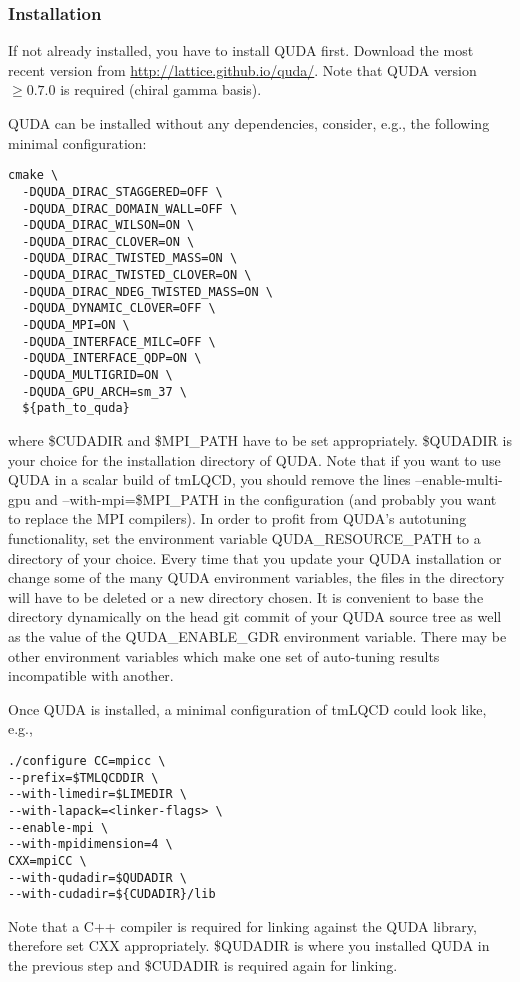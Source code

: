 \subsubsection{Installation}
If not already installed, you have to install QUDA first. Download the most recent version from \url{http://lattice.github.io/quda/}. Note that QUDA version $\geq 0.7.0$ is required (chiral gamma basis).

QUDA can be installed without any dependencies, consider, e.g., the following minimal configuration:

\begin{verbatim}
cmake \
  -DQUDA_DIRAC_STAGGERED=OFF \
  -DQUDA_DIRAC_DOMAIN_WALL=OFF \
  -DQUDA_DIRAC_WILSON=ON \
  -DQUDA_DIRAC_CLOVER=ON \
  -DQUDA_DIRAC_TWISTED_MASS=ON \
  -DQUDA_DIRAC_TWISTED_CLOVER=ON \
  -DQUDA_DIRAC_NDEG_TWISTED_MASS=ON \
  -DQUDA_DYNAMIC_CLOVER=OFF \
  -DQUDA_MPI=ON \
  -DQUDA_INTERFACE_MILC=OFF \
  -DQUDA_INTERFACE_QDP=ON \ 
  -DQUDA_MULTIGRID=ON \
  -DQUDA_GPU_ARCH=sm_37 \
  ${path_to_quda}
\end{verbatim}
where {\ttfamily \$CUDADIR} and {\ttfamily \$MPI\_PATH} have to be set appropriately.
{\ttfamily \$QUDADIR} is your choice for the installation directory of QUDA.
Note that if you want to use QUDA in a scalar build of tmLQCD, you should remove the lines {\ttfamily --enable-multi-gpu} and {\ttfamily --with-mpi=\$MPI\_PATH} in the configuration (and probably you want to replace the MPI compilers).
In order to profit from QUDA's autotuning functionality, set the environment variable {\ttfamily QUDA\_RESOURCE\_PATH} to a directory of your choice.
Every time that you update your QUDA installation or change some of the many QUDA environment variables, the files in the directory will have to be deleted or a new directory chosen.
It is convenient to base the directory dynamically on the head git commit of your QUDA source tree as well as the value of the {\ttfamily QUDA\_ENABLE\_GDR} environment variable.
There may be other environment variables which make one set of auto-tuning results incompatible with another.

Once QUDA is installed, a minimal configuration of tmLQCD could look like, e.g.,
\begin{verbatim}
./configure CC=mpicc \
--prefix=$TMLQCDDIR \
--with-limedir=$LIMEDIR \
--with-lapack=<linker-flags> \
--enable-mpi \
--with-mpidimension=4 \
CXX=mpiCC \
--with-qudadir=$QUDADIR \
--with-cudadir=${CUDADIR}/lib
\end{verbatim}
Note that a {\ttfamily C++} compiler is required for linking against the QUDA library, therefore set {\ttfamily CXX} appropriately. {\ttfamily \${QUDADIR}} is where you installed QUDA in the previous step and {\ttfamily \${CUDADIR}} is required again for linking.


